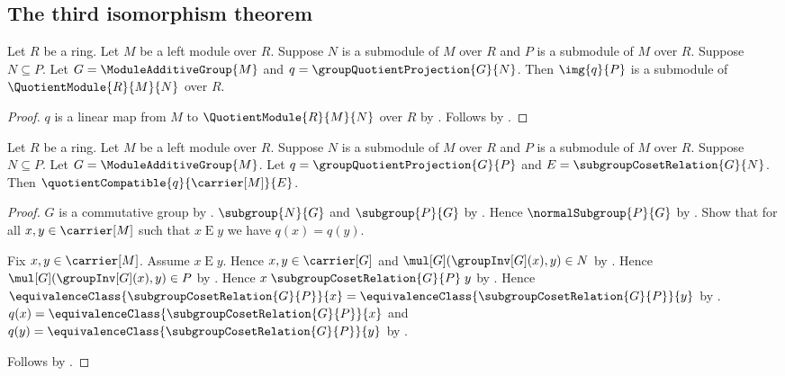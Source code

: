 \subsection{The third isomorphism theorem}

\begin{theorem}\label{module_third_isomorphism_image_submodule}
    Let $R$ be a ring.
    Let $M$ be a left module over $R$.
    Suppose $N$ is a submodule of $M$ over $R$ and
        $P$ is a submodule of $M$ over $R$.
    Suppose $N\subseteq P$.
    Let $G=\ModuleAdditiveGroup{M}$ and
        $q=\groupQuotientProjection{G}{N}$.
    Then $\img{q}{P}$ is a submodule of
        $\QuotientModule{R}{M}{N}$ over $R$.
\end{theorem}
\begin{proof}
    $q$ is a linear map from $M$ to $\QuotientModule{R}{M}{N}$ over $R$
        by .
    Follows by .
\end{proof}

\begin{theorem}\label{module_quotient_comparison_compatible}
    Let $R$ be a ring.
    Let $M$ be a left module over $R$.
    Suppose $N$ is a submodule of $M$ over $R$ and
        $P$ is a submodule of $M$ over $R$.
    Suppose $N\subseteq P$.
    Let $G=\ModuleAdditiveGroup{M}$.
    Let $q=\groupQuotientProjection{G}{P}$ and
        $E=\subgroupCosetRelation{G}{N}$.
    Then $\quotientCompatible{q}{\carrier[M]}{E}$.
\end{theorem}
\begin{proof}
    $G$ is a commutative group by
        .
    $\subgroup{N}{G}$ and $\subgroup{P}{G}$ by
        .
    Hence $\normalSubgroup{P}{G}$ by
        .
    Show that for all $x,y\in\carrier[M]$ such that $x\mathrel{E}y$
        we have $q(x)=q(y)$.
    \begin{subproof}
        Fix $x,y\in\carrier[M]$.
        Assume $x\mathrel{E}y$.
        Hence $x,y\in\carrier[G]$ and
            $\mul[G](\groupInv[G](x),y)\in N$ by
            .
        Hence $\mul[G](\groupInv[G](x),y)\in P$ by .
        Hence
            $x\mathrel{\subgroupCosetRelation{G}{P}}y$ by
            .
        Hence
            $\equivalenceClass{\subgroupCosetRelation{G}{P}}{x}
            =\equivalenceClass{\subgroupCosetRelation{G}{P}}{y}$ by
            .
        $q(x)=\equivalenceClass{\subgroupCosetRelation{G}{P}}{x}$ and
            $q(y)=\equivalenceClass{\subgroupCosetRelation{G}{P}}{y}$ by
            .
    \end{subproof}
    Follows by .
\end{proof}

